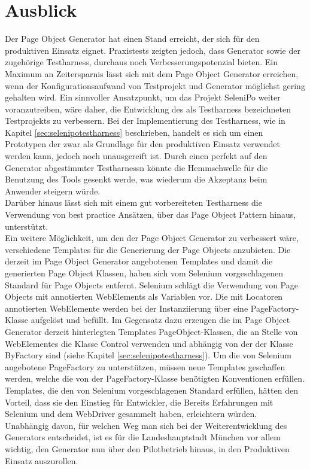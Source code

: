 \section{Ausblick}
\label{ausblick}
Der Page Object Generator hat einen Stand erreicht, der sich für den produktiven Einsatz eignet. Praxistests zeigten jedoch, dass Generator sowie der zugehörige Testharness, durchaus noch Verbesserungspotenzial bieten.
Ein Maximum an Zeitersparnis lässt sich mit dem Page Object Generator erreichen, wenn der Konfigurationsaufwand von Testprojekt und Generator möglichst gering gehalten wird.
Ein sinnvoller Ansatzpunkt, um das Projekt SeleniPo weiter voranzutreiben, wäre daher, die Entwicklung des als Testharness bezeichneten Testprojekts zu verbessern. Bei der Implementierung des Testharness, wie in Kapitel \ref{sec:selenipotestharness} beschrieben, handelt es sich um einen Prototypen der zwar als Grundlage für den produktiven Einsatz verwendet werden kann, jedoch noch unausgereift ist. Durch einen perfekt auf den Generator abgestimmter Testharnessn könnte die Hemmschwelle für die Benutzung des Tools gesenkt werde, was wiederum die Akzeptanz beim Anwender steigern würde.\\
Darüber hinaus lässt sich mit einem gut vorbereiteten Testharness die Verwendung von best practice Ansätzen, über das Page Object Pattern hinaus, unterstützt.\\
Ein weitere Möglichkeit, um den der Page Object Generator zu verbessert wäre, verschiedene Templates für die Generierung der Page Objects anzubieten.
Die derzeit im Page Object Generator angebotenen Templates und damit die generierten Page Object Klassen, haben sich vom Selenium vorgeschlagenen Standard für Page Objects entfernt. Selenium schlägt die Verwendung von Page Objects mit annotierten WebElements als Variablen vor. Die mit Locatoren annotierten WebElemente werden bei der Instanziierung über eine PageFactory-Klasse aufgelöst und befüllt.
Im Gegensatz dazu erzeugen die im Page Object Generator derzeit hinterlegten Templates PageObject-Klassen, die an Stelle von WebElementes die Klasse Control verwenden und abhängig von der der Klasse ByFactory sind (siehe Kapitel \ref{sec:selenipotestharness}). Um die von Selenium angebotene PageFactory zu unterstützen, müssen neue Templates geschaffen werden, welche die von der PageFactory-Klasse benötigten Konventionen erfüllen.
Templates, die den von Selenium vorgeschlagenen Standard erfüllen, hätten den Vorteil, dass sie den Einstieg für Entwickler, die Bereits Erfahrungen mit Selenium und dem WebDriver gesammelt haben, erleichtern würden.\\
Unabhängig davon, für welchen Weg man sich bei der Weiterentwicklung des Generators entscheidet, ist es für die Landeshauptstadt München vor allem wichtig, den Generator nun über den Pilotbetrieb hinaus, in den Produktiven Einsatz auszurollen.













